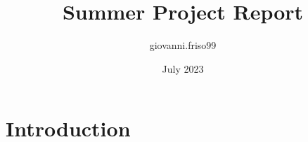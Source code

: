 \documentclass{article}
\title{Summer Project Report}
\author{giovanni.friso99 }
\date{July 2023}
\begin{document}
\maketitle

\section{Introduction}
\end{document}
